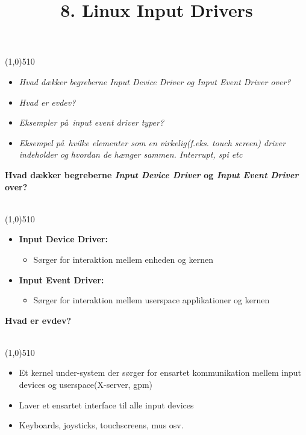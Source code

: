 \documentclass{paper}
\title{8. Linux Input Drivers}
\begin{document}
\maketitle
\line(1,0){510}
\begin{itemize}
\item \textit{Hvad d\ae kker begreberne Input Device Driver og Input Event Driver over?}
\item \textit{Hvad er evdev?}
\item \textit{Eksempler p\aa\ input event driver typer?}
\item \textit{Eksempel p\aa\ hvilke elementer som en virkelig(f.eks. touch screen) driver indeholder og hvordan de h\ae nger sammen. Interrupt, spi etc\\}
\end{itemize}

\begin{large}\textbf{Hvad d\ae kker begreberne \textit{Input Device Driver} og \textit{Input Event Driver} over?}\end{large}\\
\line(1,0){510}
\begin{itemize}
\item \textbf{Input Device Driver:}
	\begin{itemize}
	\item S\o rger for interaktion mellem enheden og kernen
	\end{itemize}
\item \textbf{Input Event Driver:}
	\begin{itemize}
	\item S\o rger for interaktion mellem userspace applikationer og kernen\\
	\end{itemize}
\end{itemize}

\begin{large}\textbf{Hvad er evdev?}\end{large}\\
\line(1,0){510}
\begin{itemize}
\item Et kernel under-system der s\o rger for ensartet kommunikation mellem input devices og userspace(X-server, gpm)
\item Laver et ensartet interface til alle input devices
\item Keyboards, joysticks, touchscreens, mus osv.\\
\end{itemize}
\end{document}
